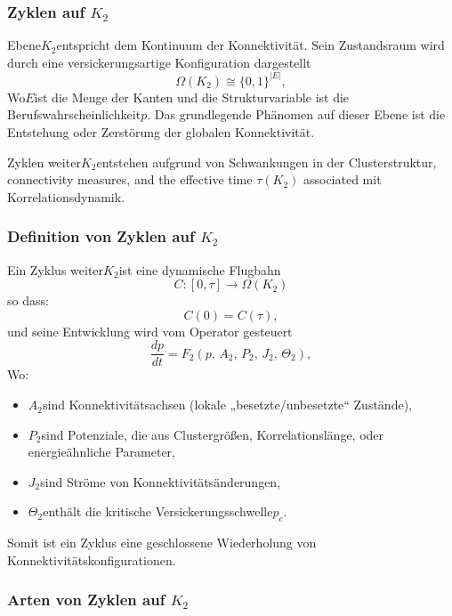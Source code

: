 
\subsubsection{Zyklen auf \texorpdfstring{$K_2$}{K_2}}
\label{sec:cycles-k2}

Ebene$K_2$entspricht dem Kontinuum der Konnektivität.
Sein Zustandsraum wird durch eine versickerungsartige Konfiguration dargestellt
\[
  \Omega(K_2) \cong \{0,1\}^{|E|},
\]
Wo$E$ist die Menge der Kanten und die Strukturvariable ist die
Berufswahrscheinlichkeit$p$.
Das grundlegende Phänomen auf dieser Ebene ist die Entstehung oder Zerstörung
der globalen Konnektivität.

Zyklen weiter$K_2$entstehen aufgrund von Schwankungen in der Clusterstruktur,
connectivity measures, and the effective time $\tau(K_2)$ associated
mit Korrelationsdynamik.

\subsubsection{Definition von Zyklen auf \texorpdfstring{$K_2$}{K_2}}

Ein Zyklus weiter$K_2$ist eine dynamische Flugbahn
\[
  C:[0,\tau]\to\Omega(K_2)
\]
so dass:
\[
  C(0)=C(\tau),
\]
und seine Entwicklung wird vom Operator gesteuert
\[
  \frac{dp}{dt}
  = F_2(p,\, A_2,\, P_2,\, J_2,\, \Theta_2),
\]
Wo:

\begin{itemize}
  \item $A_2$sind Konnektivitätsachsen (lokale „besetzte/unbesetzte“ Zustände),
  \item $P_2$sind Potenziale, die aus Clustergrößen, Korrelationslänge,
oder energieähnliche Parameter,
  \item $J_2$sind Ströme von Konnektivitätsänderungen,
  \item $\Theta_2$enthält die kritische Versickerungsschwelle$p_c$.
\end{itemize}

Somit ist ein Zyklus eine geschlossene Wiederholung von Konnektivitätskonfigurationen.

\subsubsection{Arten von Zyklen auf \texorpdfstring{$K_2$}{K_2}}

